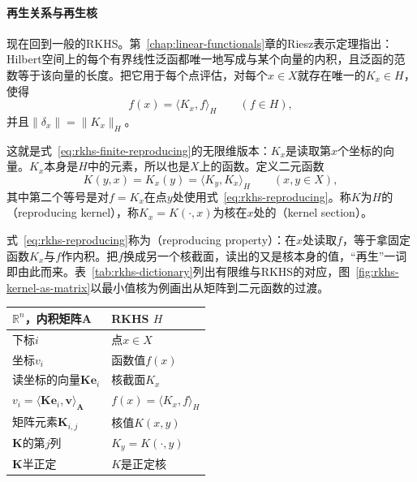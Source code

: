 \paragraph{再生关系与再生核}

现在回到一般的RKHS。第~\ref{chap:linear-functionals}章的Riesz表示定理指出：Hilbert空间上的每个有界线性泛函都唯一地写成与某个向量的内积，且泛函的范数等于该向量的长度。把它用于每个点评估，对每个$x\in X$就存在唯一的$K_x\in H$，使得
\begin{equation}
f(x)=\langle K_x,f\rangle_H\qquad(f\in H),
\label{eq:rkhs-reproducing}
\end{equation}
并且$\lVert\delta_x\rVert=\lVert K_x\rVert_H$。

这就是式~\eqref{eq:rkhs-finite-reproducing}的无限维版本：$K_x$是读取第$x$个坐标的向量。$K_x$本身是$H$中的元素，所以也是$X$上的函数。定义二元函数
\begin{equation}
K(y,x)=K_x(y)=\langle K_y,K_x\rangle_H\qquad(x,y\in X),
\label{eq:rkhs-kernel-definition}
\end{equation}
其中第二个等号是对$f=K_x$在点$y$处使用式~\eqref{eq:rkhs-reproducing}。称$K$为$H$的（reproducing kernel），称$K_x=K(\cdot,x)$为核在$x$处的（kernel section）。

式~\eqref{eq:rkhs-reproducing}称为（reproducing property）：在$x$处读取$f$，等于拿固定函数$K_x$与$f$作内积。把$f$换成另一个核截面，读出的又是核本身的值，“再生”一词即由此而来。表~\ref{tab:rkhs-dictionary}列出有限维与RKHS的对应，图~\ref{fig:rkhs-kernel-as-matrix}以最小值核为例画出从矩阵到二元函数的过渡。

\begin{BookInlineTable}
  \centering
  \begin{tabular}{@{}ll@{}}
    \toprule
    $\mathbb R^n$，内积矩阵$\bm A$ & RKHS $H$\\
    \midrule
    下标$i$ & 点$x\in X$\\
    坐标$v_i$ & 函数值$f(x)$\\
    读坐标的向量$\bm K\bm e_i$ & 核截面$K_x$\\
    $v_i=\langle\bm K\bm e_i,\bm v\rangle_{\bm A}$ & $f(x)=\langle K_x,f\rangle_H$\\
    矩阵元素$\bm K_{i,j}$ & 核值$K(x,y)$\\
    $\bm K$的第$j$列 & $K_y=K(\cdot,y)$\\
    $\bm K$半正定 & $K$是正定核\\
    \bottomrule
  \end{tabular}
  \caption{有限维内积空间与RKHS的对应。核是下标取遍$X\times X$的矩阵，核截面是它的列。}
  \label{tab:rkhs-dictionary}
\end{BookInlineTable}


